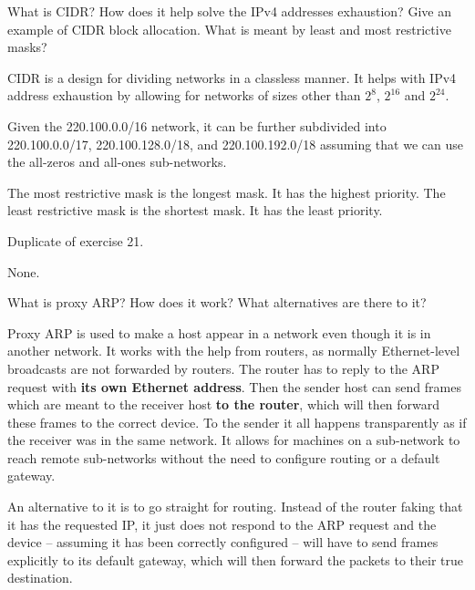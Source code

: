 \begin{Exercise}
What is CIDR? How does it help solve the IPv4 addresses exhaustion?
Give an example of CIDR block allocation.
What is meant by least and most restrictive masks?
\end{Exercise}
\begin{Answer}
CIDR is a design for dividing networks in a classless manner.
It helps with IPv4 address exhaustion by allowing for networks of sizes other than \(2^{8}\), \(2^{16}\) and \(2^{24}\).

Given the 220.100.0.0/16 network, it can be further subdivided into 220.100.0.0/17, 220.100.128.0/18, and 220.100.192.0/18 assuming that we can use the all-zeros and all-ones sub-networks.

The most restrictive mask is the longest mask. It has the highest priority.
The least restrictive mask is the shortest mask. It has the least priority.
\end{Answer}

\begin{Exercise}
Duplicate of exercise 21.
\end{Exercise}
\begin{Answer}
None.
\end{Answer}

\begin{Exercise}
What is proxy ARP? How does it work? What alternatives are there to it?
\end{Exercise}
\begin{Answer}
Proxy ARP is used to make a host appear in a network even though it is in another network.
It works with the help from routers, as normally Ethernet-level broadcasts are not forwarded by routers.
The router has to reply to the ARP request with \textbf{its own Ethernet address}.
Then the sender host can send frames which are meant to the receiver host \textbf{to the router}, which will then forward these frames to the correct device.
To the sender it all happens transparently as if the receiver was in the same network.
It allows for machines on a sub-network to reach remote sub-networks without the need to configure routing or a default gateway.

An alternative to it is to go straight for routing. Instead of the router faking that it has the requested IP, it just does not respond to the ARP request and the device -- assuming it has been correctly configured -- will have to send frames explicitly to its default gateway, which will then forward the packets to their true destination.
\end{Answer}

